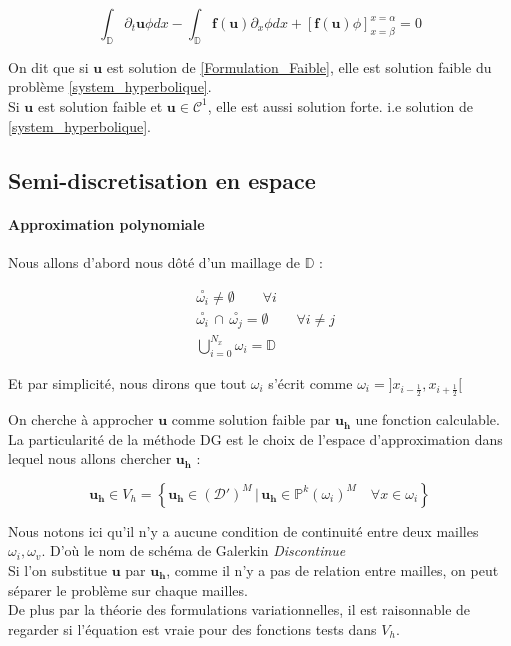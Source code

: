 \begin{equation}\label{Formulation_Faible}
    \int_\mathbb{D} \partial_t \mathbf{u} \phi dx - \int_\mathbb{D} \mathbf{f}(\mathbf{u}) \partial_x \phi dx + \left[\mathbf{f}(\mathbf{u})\phi\right]^{x=\alpha}_{x=\beta} = 0 
\end{equation}

On dit que si $\mathbf{u}$ est solution de \eqref{Formulation_Faible}, elle est solution faible du problème \eqref{system_hyperbolique}. \\
Si $\mathbf{u}$ est solution faible et $\mathbf{u}\in \mathcal{C}^1$, elle est aussi solution forte. i.e solution de \eqref{system_hyperbolique}.

\subsection{Semi-discretisation en espace}

\paragraph{Approximation polynomiale\\}
Nous allons d'abord nous dôté d'un maillage de $\mathbb{D}$ :

\begin{align}
\label{maillage1}     & \overset{\circ}{\omega_i} \neq \emptyset \qquad  \forall i\\
\label{maillage2}     & \overset{\circ}{\omega_i} \,\cap \, \overset{\circ}{\omega_j} = \emptyset  \qquad \forall i\neq j\\
\label{maillage3}     & \bigcup_{i=0}^{N_x} \omega_i = \mathbb{D}
\end{align}

Et par simplicité, nous dirons que tout $\omega_i$ s'écrit comme $\omega_i = ]x_{i-\frac{1}{2}}, x_{i+\frac{1}{2}}[$

On cherche à approcher $\mathbf{u}$ comme solution faible par $\mathbf{u_h}$ une fonction calculable.\\
La particularité de la méthode DG est le choix de l'espace d'approximation dans lequel nous allons chercher $\mathbf{u_h}$ : 

\begin{equation}
    \mathbf{u_h} \in V_h = \left\{ \mathbf{u_h} \in (\mathcal{D'})^M \,|\, \mathbf{u_h} \in \mathbb{P}^k(\omega_i)^M \quad \forall x\in \omega_i \right\}
\end{equation}

Nous notons ici qu'il n'y a aucune condition de continuité entre deux mailles $\omega_i, \omega_v$. D'où le nom de schéma de Galerkin \textit{Discontinue} \\
Si l'on substitue $\mathbf{u}$ par $\mathbf{u_h}$, comme il n'y a pas de relation entre mailles, on peut séparer le problème sur chaque mailles. \\
De plus par la théorie des formulations variationnelles, il est raisonnable de regarder si l'équation est vraie pour des fonctions tests dans $V_h$.

